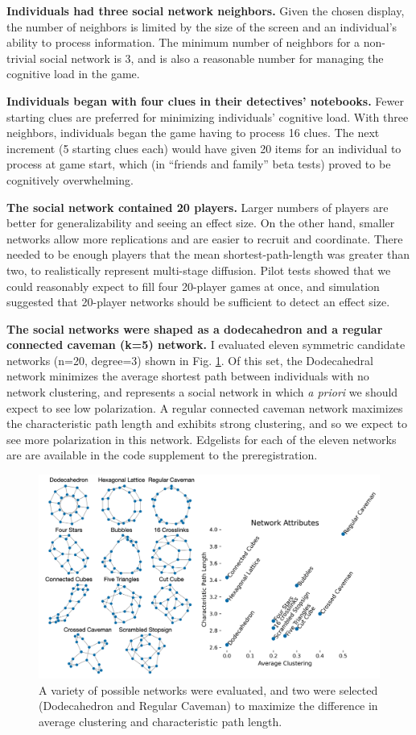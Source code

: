 \documentclass{article}
\begin{document}
\textbf{Individuals had three social network neighbors.} 
Given the chosen display, the number of neighbors is limited by the size of the screen and an individual’s ability to process information. The minimum number of neighbors for a non-trivial social network is 3, and is also a reasonable number for managing the cognitive load in the game.

\textbf{Individuals began with four clues in their detectives' notebooks.}
Fewer starting clues are preferred for minimizing individuals' cognitive load. With three neighbors, individuals began the game having to process 16 clues. The next increment (5 starting clues each) would have given 20 items for an individual to process at game start, which (in ``friends and family'' beta tests) proved to be cognitively overwhelming.

\textbf{The social network contained 20 players.}
Larger numbers of players are better for generalizability and seeing an effect size. On the other hand, smaller networks allow more replications and are easier to recruit and coordinate. There needed to be enough players that the mean shortest-path-length was greater than two, to realistically represent multi-stage diffusion. Pilot tests showed that we could reasonably expect to fill four 20-player games at once, and simulation suggested that 20-player networks should be sufficient to detect an effect size.

\textbf{The social networks were shaped as a dodecahedron and a regular connected caveman (k=5) network.}
I evaluated eleven symmetric candidate networks (n=20, degree=3) shown in Fig. \ref{fig:all_networks}. Of this set, the Dodecahedral network minimizes the average shortest path between individuals with no network clustering, and represents a social network in which \textit{a priori} we should expect to see low polarization. A regular connected caveman network maximizes the characteristic path length and exhibits strong clustering, and so we expect to see more polarization in this network. Edgelists for each of the eleven networks are are available in the code supplement to the preregistration. 

\begin{figure}[h!]
\centering
\includegraphics[width=0.9\columnwidth]{All Networks.png}
\caption{A variety of possible networks were evaluated, and two were selected (Dodecahedron and Regular Caveman) to maximize the difference in average clustering and characteristic path length.}
\label{fig:all_networks}
\end{figure}
\end{document}
